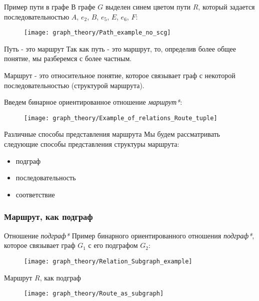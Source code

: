 \begin{frame}{Пример пути в графе}
  В графе $G$ выделен синем цветом пути $R$, который задается
  последовательностью $A$, $e_2$, $B$, $e_5$, $E$, $e_6$, $F$:
  \begin{figure}
    \centering
    \texttt{[image: graph\_theory/Path\_example\_no\_scg]}
  \end{figure}
\end{frame}

\begin{frame}{Путь - это маршрут}
  Так как путь - это маршрут, то, определив более общее понятие, мы
  разберемся с более частным.

  Маршрут - это относительное понятие, которое связывает граф с
  некоторой последовательностью (структурой маршрута).

  Введем бинарное ориентированное отношение \textit{маршрут*}:
  \begin{figure}
    \centering
    \texttt{[image: graph\_theory/Example\_of\_relations\_Route\_tuple]}
  \end{figure}
\end{frame}

\begin{frame}{Различные способы представления маршрута}
  Мы будем рассматривать следующие способы представления структуры
  маршрута:
  \begin{itemize}
  \item подграф
  \item последовательность
  \item соответствие
  \end{itemize}
\end{frame}

\subsubsection{Маршрут, как подграф}

\begin{frame}{Отношение \textit{подграф*}}
  Пример бинарного ориентированного отношения \textit{подграф*},
  которое связывает граф $G_1$ с его подграфом $G_2$:
  \begin{figure}
    \centering
    \texttt{[image: graph\_theory/Relation\_Subgraph\_example]}
  \end{figure}
\end{frame}

\begin{frame}{Маршрут $R$, как подграф}
  \begin{figure}
    \centering
    \texttt{[image: graph\_theory/Route\_as\_subgraph]}
  \end{figure}
\end{frame}

